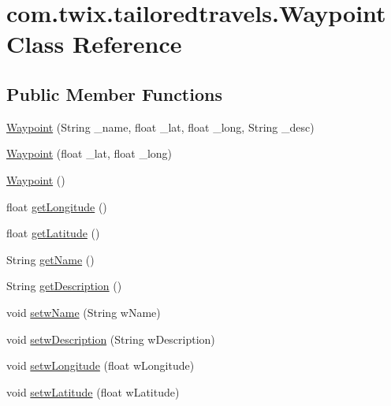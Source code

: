 \hypertarget{classcom_1_1twix_1_1tailoredtravels_1_1_waypoint}{\section{com.\-twix.\-tailoredtravels.\-Waypoint Class Reference}
\label{classcom_1_1twix_1_1tailoredtravels_1_1_waypoint}
}
\subsection*{Public Member Functions}
\begin{DoxyCompactItemize}
\item 
\hyperlink{classcom_1_1twix_1_1tailoredtravels_1_1_waypoint_ac044cb6236cc8f91e403d5e397b0138c}{Waypoint} (String \-\_\-name, float \-\_\-lat, float \-\_\-long, String \-\_\-desc)
\item 
\hyperlink{classcom_1_1twix_1_1tailoredtravels_1_1_waypoint_a3cb2334fde8914ad02eca0daee98b052}{Waypoint} (float \-\_\-lat, float \-\_\-long)
\item 
\hyperlink{classcom_1_1twix_1_1tailoredtravels_1_1_waypoint_a6311fa930e1ebacee5795a7561f7d154}{Waypoint} ()
\item 
float \hyperlink{classcom_1_1twix_1_1tailoredtravels_1_1_waypoint_a0e9dfbf7825a6bc9494fe0ad5d28cf06}{get\-Longitude} ()
\item 
float \hyperlink{classcom_1_1twix_1_1tailoredtravels_1_1_waypoint_acd8b73a13740dcc01cfdf0f51afabc98}{get\-Latitude} ()
\item 
String \hyperlink{classcom_1_1twix_1_1tailoredtravels_1_1_waypoint_aa3e053c2012fd6c83ac266ebae053d41}{get\-Name} ()
\item 
String \hyperlink{classcom_1_1twix_1_1tailoredtravels_1_1_waypoint_a3d3b52f82622f22c603c06d1628fba4d}{get\-Description} ()
\item 
void \hyperlink{classcom_1_1twix_1_1tailoredtravels_1_1_waypoint_acde4707588dffddc9b270ac010ac3c49}{setw\-Name} (String w\-Name)
\item 
void \hyperlink{classcom_1_1twix_1_1tailoredtravels_1_1_waypoint_a3c4ea883b15c1f255d7debcefad30a3f}{setw\-Description} (String w\-Description)
\item 
void \hyperlink{classcom_1_1twix_1_1tailoredtravels_1_1_waypoint_a0a8ac77e3bbdcc661d84f221a890fa63}{setw\-Longitude} (float w\-Longitude)
\item 
void \hyperlink{classcom_1_1twix_1_1tailoredtravels_1_1_waypoint_aa5ff7b18588db74d9535a228106a2590}{setw\-Latitude} (float w\-Latitude)

\end{DoxyCompactItemize}
